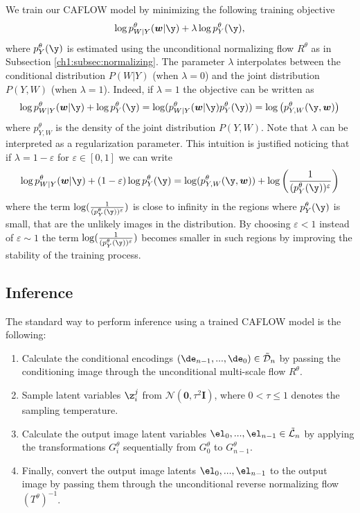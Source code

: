 We train our CAFLOW model by minimizing the following training objective \begin{align*}
        \log p^\theta_{W|Y}(\boldsymbol{w} | \y) + \lambda \log p^\theta_{Y}(\y),
        \end{align*}
        where $p^\theta_{Y}(\y)$ is estimated using the unconditional normalizing flow $R^\theta$ as in Subsection \ref{ch1:subsec:normalizing}.
        The parameter $\lambda$ interpolates between the conditional distribution $P(W|Y)$ (when $\lambda = 0$) and the joint distribution $P(Y,W)$ (when $\lambda = 1$).
        Indeed, if $\lambda = 1$ the objective can be written as
        \begin{align}
        \log p^\theta_{W|Y}(\boldsymbol{w} | \y) +  \log p^\theta_{Y}(\y) = \log (p^\theta_{W|Y}(\boldsymbol{w} | \y)p^\theta_{Y}(\y)) = \log\left(p^\theta_{Y,W}(\y,\boldsymbol{w})\right)
        \end{align}
        where $p^\theta_{Y,W}$ is the density of the joint distribution $P(Y,W)$.
        Note that $\lambda$ can be interpreted as a regularization parameter. This intuition is justified noticing that if $\lambda = 1 - \varepsilon$ for $\varepsilon \in [0,1]$ we can write
        \begin{align}
           \log p^\theta_{W|Y}(\boldsymbol{w} | \y) +  (1-\varepsilon) \log p^\theta_{Y}(\y) =  \log(p^\theta_{Y,W}(\y,\boldsymbol{w})) + \log\left(\frac{1}{(p^\theta_Y(\y))^\varepsilon}\right)  
        \end{align}
        where the term $\log(\frac{1}{(p^\theta_Y(\y))^\varepsilon})$ 
        is close to infinity in the regions where $p^\theta_Y(\y)$ is small, that are the unlikely images in the distribution. By choosing $\varepsilon < 1$ instead of $\varepsilon \sim 1$ the term $\log(\frac{1}{(p^\theta_Y(\y))^\varepsilon})$ becomes smaller in such regions by improving the stability of the training process. 
    

\subsection{Inference}

The standard way to perform inference using a trained CAFLOW model is the following: 
\begin{enumerate}
        \item Calculate the conditional encodings $(\de_{n-1},...,\de_0) \in \tilde{\mathcal{D}}_n$ by passing the conditioning image through the unconditional multi-scale flow $R^\theta$.
        \item Sample latent variables $\z_i^j$ from $\mathcal{N}(\textbf{0},\tau^2 \textbf{I})$, where $0<\tau \leq 1$ denotes the sampling temperature.
        \item Calculate the output image latent variables $\el_0,...,\el_{n-1} \in \tilde{\mathcal{L}}_n$ by applying the transformations $G^\theta_i$ sequentially from $G^\theta_0$ to $G^\theta_{n-1}$.
        \item Finally, convert the output image latents $\el_0,...,\el_{n-1}$ to the output image by passing them through the unconditional reverse normalizing flow $(T^\theta)^{-1}$.
\end{enumerate}

